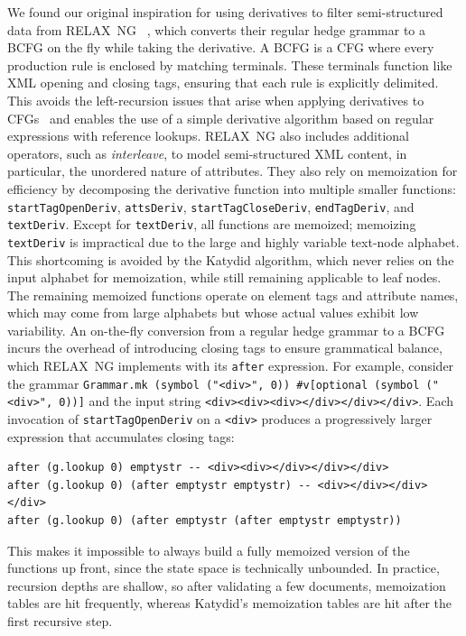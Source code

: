 \documentclass[runningheads]{llncs}
\newcommand{\RelaxNG}{%
  RELAX~NG\xspace%
}
\newcommand{\BCFG}{\ac{BCFG}\xspace}
\newcommand{\CFG}{\ac{CFG}\xspace}
\newcommand{\CFGs}{\acp{CFG}\xspace}
\newcommand{\XML}{\ac{XML}\xspace}
\begin{document}
We found our original inspiration for using derivatives to filter semi-structured data from \RelaxNG~\cite{relaxng2001simple}, which converts their regular hedge grammar to a \BCFG on the fly while taking the derivative.
A \BCFG is a \CFG where every production rule is enclosed by matching terminals.
These terminals function like \XML opening and closing tags, ensuring that each rule is explicitly delimited.
This avoids the left-recursion issues that arise when applying derivatives to \CFGs~\cite{might2011parsing} and enables the use of a simple derivative algorithm based on regular expressions with reference lookups.
\RelaxNG also includes additional operators, such as \emph{interleave}, to model semi-structured \XML content, in particular, the unordered nature of attributes.
They also rely on memoization for efficiency by decomposing the derivative function into multiple smaller functions: \lstinline{startTagOpenDeriv}, \lstinline{attsDeriv}, \lstinline{startTagCloseDeriv}, \lstinline{endTagDeriv}, and \lstinline{textDeriv}.
Except for \lstinline{textDeriv}, all functions are memoized; memoizing \lstinline{textDeriv} is impractical due to the large and highly variable text-node alphabet.
This shortcoming is avoided by the Katydid algorithm, which never relies on the input alphabet for memoization, while still remaining applicable to leaf nodes.
The remaining memoized functions operate on element tags and attribute names, which may come from large alphabets but whose actual values exhibit low variability.
An on-the-fly conversion from a regular hedge grammar to a \BCFG incurs the overhead of introducing closing tags to ensure grammatical balance, which \RelaxNG implements with its \lstinline{after} expression.
For example, consider the grammar \lstinline{Grammar.mk (symbol ("<div>", 0)) #v[optional (symbol ("<div>", 0))]} and the input string \lstinline{<div><div><div></div></div></div>}.
Each invocation of \lstinline{startTagOpenDeriv} on a \lstinline{<div>} produces a progressively larger expression that accumulates closing tags:
\begin{lstlisting}
after (g.lookup 0) emptystr -- <div><div></div></div></div>
after (g.lookup 0) (after emptystr emptystr) -- <div></div></div></div>
after (g.lookup 0) (after emptystr (after emptystr emptystr))
\end{lstlisting}
This makes it impossible to always build a fully memoized version of the functions up front, since the state space is technically unbounded.
In practice, recursion depths are shallow, so after validating a few documents, memoization tables are hit frequently, whereas Katydid's memoization tables are hit after the first recursive step.
\end{document}
